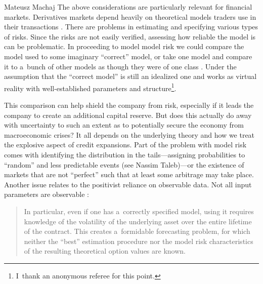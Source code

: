 \begin{artengenv}{Mateusz Machaj}
The above considerations are particularly relevant for financial markets. Derivatives markets depend heavily on theoretical models traders use in their transactions 
\parencite[][p.1466]{green_market_1999}. %
 There are problems in estimating and specifying various types of risks. Since the risks are not easily verified, assessing how reliable the model is can be problematic. In proceeding to model model risk we could compare the model used to some imaginary ``correct'' model, or take one model and compare it to a~bunch of other models as though they were of one class 
\parencite[][p.268]{kerkhof_model_2010}. %
 Under the assumption that the ``correct model'' is still an idealized one and works as virtual reality with well-established parameters and structure\footnote{I~thank an anonymous referee for this point.}.



This comparison can help shield the company from risk, especially if it leads the company to create an additional capital reserve. But does this actually do away with uncertainty to such an extent as to potentially secure the economy from macroeconomic crises? It all depends on the underlying theory and how we treat the explosive aspect of credit expansions. Part of the problem with model risk comes with identifying the distribution in the tails---assigning probabilities to ``random'' and less predictable events (see Nassim Taleb)---or the existence of markets that are not ``perfect'' such that at least some arbitrage may take place. Another issue relates to the positivist reliance on observable data. Not all input parameters are observable 
\parencite[][p.1467]{green_market_1999}:%
\begin{quote}
In particular, even if one has a~correctly specified model, using it requires knowledge of the volatility of the underlying asset over the entire lifetime of the contract. This creates a~formidable forecasting problem, for which neither the ``best'' estimation procedure nor the model risk characteristics of the resulting theoretical option values are known.
\end{quote}




\end{artengenv}
